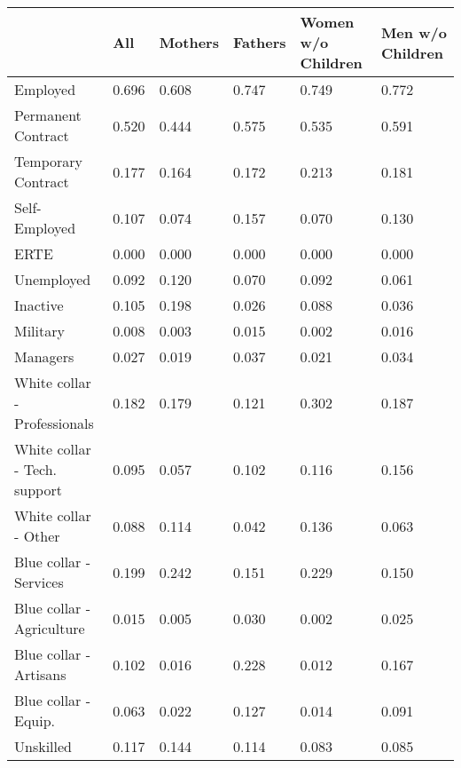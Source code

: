\begin{tabular}{llllll}
\toprule
{} &     All & Mothers & Fathers & Women w/o Children & Men w/o Children \\
\midrule
Employed                     &   0.696 &   0.608 &   0.747 &              0.749 &            0.772 \\
Permanent Contract           &   0.520 &   0.444 &   0.575 &              0.535 &            0.591 \\
Temporary Contract           &   0.177 &   0.164 &   0.172 &              0.213 &            0.181 \\
Self-Employed                &   0.107 &   0.074 &   0.157 &              0.070 &            0.130 \\
ERTE                         &   0.000 &   0.000 &   0.000 &              0.000 &            0.000 \\
Unemployed                   &   0.092 &   0.120 &   0.070 &              0.092 &            0.061 \\
Inactive                     &   0.105 &   0.198 &   0.026 &              0.088 &            0.036 \\
Military                     &   0.008 &   0.003 &   0.015 &              0.002 &            0.016 \\
Managers                     &   0.027 &   0.019 &   0.037 &              0.021 &            0.034 \\
White collar - Professionals &   0.182 &   0.179 &   0.121 &              0.302 &            0.187 \\
White collar - Tech. support &   0.095 &   0.057 &   0.102 &              0.116 &            0.156 \\
White collar - Other         &   0.088 &   0.114 &   0.042 &              0.136 &            0.063 \\
Blue collar - Services       &   0.199 &   0.242 &   0.151 &              0.229 &            0.150 \\
Blue collar - Agriculture    &   0.015 &   0.005 &   0.030 &              0.002 &            0.025 \\
Blue collar - Artisans       &   0.102 &   0.016 &   0.228 &              0.012 &            0.167 \\
Blue collar - Equip.         &   0.063 &   0.022 &   0.127 &              0.014 &            0.091 \\
Unskilled                    &   0.117 &   0.144 &   0.114 &              0.083 &            0.085 \\

\end{tabular}
